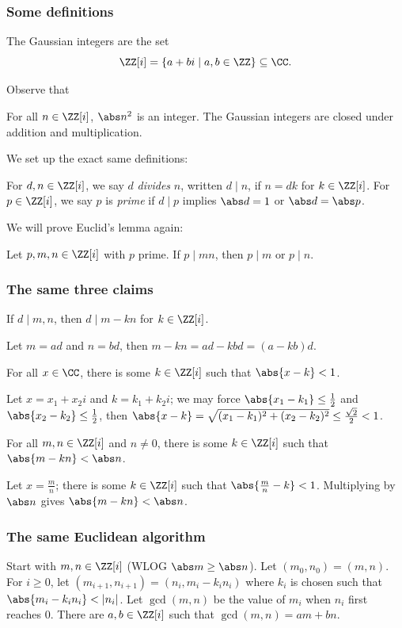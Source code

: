 \documentclass{beamer}
\begin{document}
\begin{frame}
	\frametitle{Some definitions}
	The Gaussian integers are the set
	\[\ZZ[i] = \{a + bi \mid a,b \in \ZZ\} \subseteq \CC.\]

	Observe that
	\begin{itemize}
		\ii For all $n \in \ZZ[i]$, $\abs n^2$ is an integer.
		\ii The Gaussian integers are closed under addition and multiplication.
	\end{itemize}

	We set up the exact same definitions:
	\begin{itemize}
		\ii For $d,n \in \ZZ[i]$, we say $d$ \emph{divides} $n$, written $d \mid n$, if $n = dk$ for $k \in \ZZ[i]$.
		\ii For $p \in \ZZ[i]$, we say $p$ is \emph{prime} if $d \mid p$ implies $\abs d = 1$ or $\abs d = \abs p$.
	\end{itemize}

	We will prove Euclid's lemma again:
	\begin{lemma}
		Let $p,m,n \in \ZZ[i]$ with $p$ prime. If $p \mid mn$, then $p \mid m$ or $p \mid n$.
	\end{lemma}
\end{frame}

\begin{frame}
	\frametitle{The same three claims}
	\begin{block}{}
		If $d \mid m,n$, then $d \mid m - kn$ for $k \in \ZZ[i]$.
	\end{block}
	Let $m = ad$ and $n = bd$, then $m - kn = ad - kbd = (a - kb)d$.

	\begin{block}{}
		For all $x \in \CC$, there is some $k \in \ZZ[i]$ such that $\abs{x - k} < 1$.
	\end{block}
	Let $x = x_1 + x_2i$ and $k = k_1 + k_2i$; we may force $\abs{x_1 - k_1} \le \frac12$ and $\abs{x_2 - k_2} \le \frac12$, then $\abs{x - k} = \sqrt{(x_1 - k_1)^2 + (x_2 - k_2)^2} \le \frac{\sqrt 2}2 < 1$.
	
	\begin{block}{}
		For all $m,n \in \ZZ[i]$ and $n \neq 0$, there is some $k \in \ZZ[i]$ such that $\abs{m - kn} < \abs n$.
	\end{block}
	Let $x = \frac mn$; there is some $k \in \ZZ[i]$ such that $\abs{\frac mn - k} < 1$. Multiplying by $\abs n$ gives $\abs{m - kn} < \abs n$.
\end{frame}

\begin{frame}
	\frametitle{The same Euclidean algorithm}
	\begin{itemize}
		\ii Start with $m,n \in \ZZ[i]$ (WLOG $\abs m \ge \abs n$).
		\ii Let $(m_0,n_0) = (m,n)$.
		\ii For $i \ge 0$, let $(m_{i + 1},n_{i + 1}) = (n_i,m_i - k_in_i)$ where $k_i$ is chosen such that $\abs{m_i - k_in_i} < \lvert n_i\rvert$.
		\ii Let $\gcd(m,n)$ be the value of $m_i$ when $n_i$ first reaches $0$.
		\ii There are $a,b \in \ZZ[i]$ such that $\gcd(m,n) = am + bn$.
	\end{itemize}
\end{frame}
\end{document}
